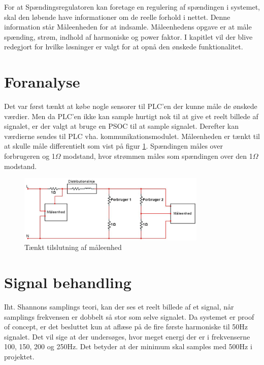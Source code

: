 
For at Spændingsregulatoren kan foretage en regulering af spændingen i systemet, skal den løbende have informationer om de reelle forhold i nettet. Denne information står Måleenheden for at indsamle. Måleenhedens opgave er at måle spænding, strøm, indhold af harmoniske og power faktor. I kapitlet vil der blive redegjort for hvilke løsninger er valgt for at opnå den ønskede funktionalitet. 

\section{Foranalyse}
Det var først tænkt at købe nogle sensorer til PLC'en der kunne måle de ønskede værdier. Men da PLC'en ikke kan sample hurtigt nok til at give et reelt billede af signalet, er der valgt at bruge en PSOC til at sample signalet. Derefter kan værdierne sendes til PLC vha. kommunikationsmodulet. Måleenheden er tænkt til at skulle måle differentielt som vist på figur \ref{fig:MaalForanalyse}. Spændingen måles over forbrugeren og 1$\Omega$ modstand, hvor strømmen måles som spændingen over den 1$\Omega$ modstand.

\begin{figure}[H] %
	\centering
	\includegraphics[width=0.8\textwidth]{figure/MaalForanalyse}
	\caption{Tænkt tilslutning af måleenhed}
	\label{fig:MaalForanalyse}
\end{figure}

\section{Signal behandling}

Iht. Shannons samplings teori\cite{Shannon}, kan der ses et reelt billede af et signal, når samplings frekvensen er dobbelt så stor som selve signalet. Da systemet er proof of concept, er det besluttet kun at aflæse på de fire første harmoniske til 50Hz signalet. Det vil sige at der undersøges, hvor meget energi der er i frekvenserne 100, 150, 200 og 250Hz. Det betyder at der minimum skal samples med 500Hz i projektet.

